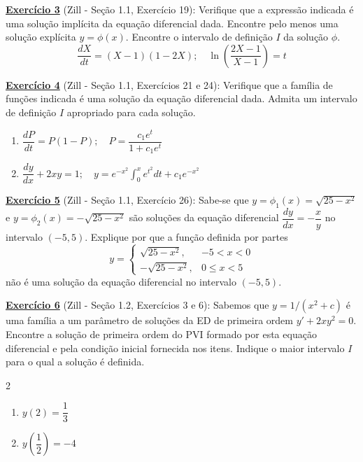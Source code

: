 \documentclass[oneside,12pt,a4paper]{report}
\begin{document}
    \noindent\textbf{\hyperlink{resp:ex3}{\hypertarget{quest:ex3}{Exercício 3}}} (Zill - Seção 1.1, Exercício 19): Verifique que a expressão indicada é uma solução implícita da equação diferencial dada. Encontre pelo menos uma solução explícita $y=\phi(x)$. Encontre o intervalo de definição $I$ da solução $\phi$. 
    \begin{equation*}
        \frac{dX}{dt}=(X-1)(1-2X); \quad \ln\left(\frac{2X-1}{X-1}\right)=t
    \end{equation*}
    \vspace{0.5cm}

    \noindent\textbf{\hyperlink{resp:ex4}{\hypertarget{quest:ex4}{Exercício 4}}} (Zill - Seção 1.1, Exercícios 21 e 24): Verifique que a família de funções indicada é uma solução da equação diferencial dada. Admita um intervalo de definição $I$ apropriado para cada solução.
    \begin{enumerate}[label=\alph*)]
        \item $\dfrac{dP}{dt} = P(1 - P); \quad P = \dfrac{c_1e^t}{1 + c_1e^t}$
        \item $\dfrac{dy}{dx} + 2xy = 1; \quad y = e^{-x^2} \displaystyle\int_0^x e^{t^2} dt + c_1e^{-x^2}$
    \end{enumerate}
    \vspace{0.5cm}

    \noindent\textbf{\hyperlink{resp:ex5}{\hypertarget{quest:ex5}{Exercício 5}}} (Zill - Seção 1.1, Exercício 26): Sabe-se que $y=\phi_1(x)=\sqrt{25-x^2}$ e $y=\phi_2(x)=-\sqrt{25-x^2}$ são soluções da equação diferencial $\dfrac{dy}{dx}=-\dfrac{x}{y}$ no intervalo $(-5, 5)$. Explique por que a função definida por partes
    \begin{equation*}
        y = \begin{cases}
            \sqrt{25-x^2}, & -5 < x < 0 \\
            -\sqrt{25-x^2}, & 0 \leq x < 5
            
        \end{cases}
    \end{equation*}
    não é uma solução da equação diferencial no intervalo $(-5, 5)$.
    \vspace{0.5cm}

    \noindent\textbf{\hyperlink{resp:ex6}{\hypertarget{quest:ex6}{Exercício 6}}} (Zill - Seção 1.2, Exercícios 3 e 6):
    Sabemos que $y=1/(x^2+c)$ é uma família a um parâmetro de soluções da ED de primeira ordem $y'+2xy^2=0$. Encontre a solução de primeira ordem do PVI formado por esta equação diferencial e pela condição inicial fornecida nos itens. Indique o maior intervalo $I$ para o qual a solução é definida.
    \begin{multicols}{2}
        \begin{enumerate}[label=\alph*)]
            \item $y(2)=\dfrac{1}{3}$
            \item $y\left(\dfrac{1}{2}\right)=-4$
        \end{enumerate}
    \end{multicols}
    \vspace{0.5cm}
\end{document}
